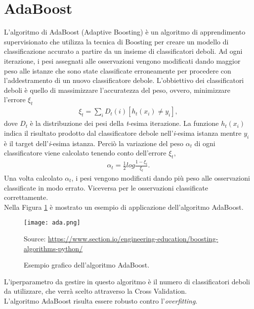 \section{AdaBoost}
L'algoritmo di AdaBoost (Adaptive Boosting) \autocite{auer1995gambling} è un algoritmo di apprendimento supervisionato che utilizza la tecnica di Boosting per creare un modello di classificazione accurato a partire da un insieme di classificatori deboli. Ad ogni iterazione, i pesi assegnati alle osservazioni vengono modificati dando maggior peso alle istanze che sono state classificate erroneamente per procedere con l'addestramento di un nuovo classificatore debole. L'obbiettivo dei classificatori deboli è quello di massimizzare l'accuratezza del peso, ovvero, minimizzare l'errore $\xi_t$
\begin{align*}
	\xi_t = \sum_{i} D_{t}(i)[h_{t}(x_{i}) \neq y_{i}],
\end{align*} 
dove $D_{t}$ è la distribuzione dei pesi della \emph{t}-esima iterazione. La funzione $h_{t}(x_{i})$ indica il risultato prodotto dal classificatore debole nell'\emph{i}-esima istanza mentre $ y_{i}$ è il target dell'\emph{i}-esima istanza. Perciò la variazione del peso $\alpha_t$ di ogni classificatore viene calcolato tenendo conto dell'errore $\xi_t$,
\begin{align*}
	\alpha_t = \frac{1}{2}log\frac{1-\xi_t}{\xi_t}.
\end{align*} 
Una volta calcolato $\alpha_t$, i pesi vengono modificati dando più peso alle osservazioni classificate in modo errato. Viceversa per le osservazioni classificate correttamente.\\
Nella Figura \ref{fig:ada} è mostrato un esempio di applicazione dell'algoritmo AdaBoost.
\begin{figure}[h]
	\begin{center}
		\texttt{[image: ada.png]}
		\caption{Esempio grafico dell'algoritmo AdaBoost.
		} 
		Source: \url{https://www.section.io/engineering-education/boosting-algorithms-python/}\label{fig:ada}
	\end{center}
\end{figure}
L'iperparametro da gestire in questo algoritmo è il numero di classificatori deboli da utilizzare, che verrà scelto attraverso la Cross Validation.\\
L'algoritmo AdaBoost risulta essere robusto contro l'\emph{overfitting}.
	

